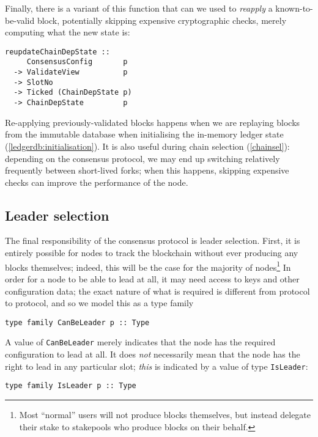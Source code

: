 Finally, there is a variant of this function that can we used to \emph{reapply}
a known-to-be-valid block, potentially skipping expensive cryptographic checks,
merely computing what the new state is:

\begin{lstlisting}
reupdateChainDepState ::
     ConsensusConfig       p
  -> ValidateView          p
  -> SlotNo
  -> Ticked (ChainDepState p)
  -> ChainDepState         p
\end{lstlisting}

Re-applying previously-validated blocks happens when we are replaying blocks
from the immutable database when initialising the in-memory ledger state
(\cref{ledgerdb:initialisation}). It is also useful during chain selection
(\cref{chainsel}): depending on the consensus protocol, we may end up switching
relatively frequently between short-lived forks; when this happens, skipping
expensive checks can improve the performance of the node. 

\subsection{Leader selection}
\label{class:ConsensusProtocol:leaderselection}

The final responsibility of the consensus protocol is leader selection. First,
it is entirely possible for nodes to track the blockchain without ever producing
any blocks themselves; indeed, this will be the case for the majority of
nodes\footnote{Most ``normal'' users will not produce blocks themselves, but
instead delegate their stake to stakepools who produce blocks on their behalf.}
In order for a node to be able to lead at all, it may need access to keys and
other configuration data; the exact nature of what is required is different
from protocol to protocol, and so we model this as a type family

\begin{lstlisting}
type family CanBeLeader p :: Type
\end{lstlisting}

A value of \lstinline!CanBeLeader! merely indicates that the node has the
required configuration to lead at all. It does \emph{not} necessarily mean that
the node has the right to lead in any particular slot; \emph{this} is indicated
by a value of type \lstinline!IsLeader!:

\begin{lstlisting}
type family IsLeader p :: Type
\end{lstlisting}


